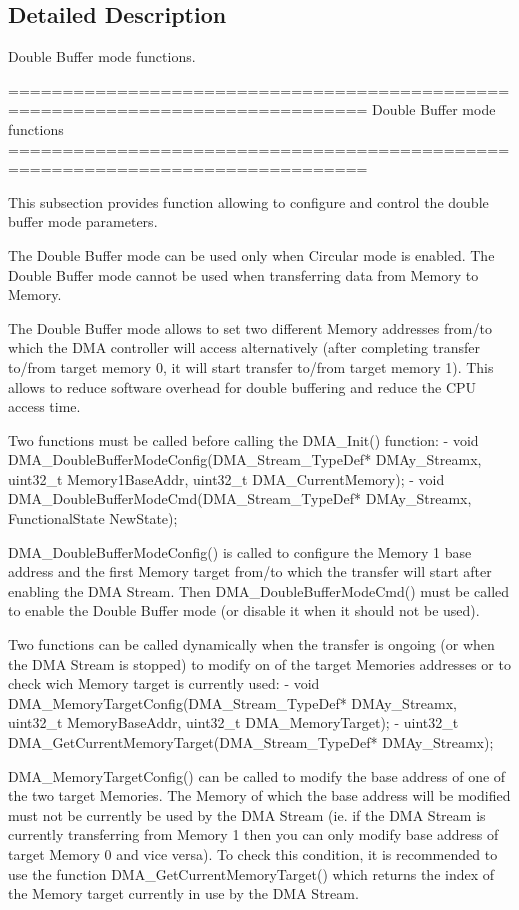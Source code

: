\subsection{Detailed Description}
Double Buffer mode functions. \begin{DoxyVerb} ===============================================================================
                         Double Buffer mode functions
 ===============================================================================  

  This subsection provides function allowing to configure and control the double 
  buffer mode parameters.
  
  The Double Buffer mode can be used only when Circular mode is enabled.
  The Double Buffer mode cannot be used when transferring data from Memory to Memory.
  
  The Double Buffer mode allows to set two different Memory addresses from/to which
  the DMA controller will access alternatively (after completing transfer to/from target
  memory 0, it will start transfer to/from target memory 1).
  This allows to reduce software overhead for double buffering and reduce the CPU
  access time.

  Two functions must be called before calling the DMA_Init() function:
   - void DMA_DoubleBufferModeConfig(DMA_Stream_TypeDef* DMAy_Streamx, uint32_t Memory1BaseAddr,
                                uint32_t DMA_CurrentMemory);
   - void DMA_DoubleBufferModeCmd(DMA_Stream_TypeDef* DMAy_Streamx, FunctionalState NewState);
   
  DMA_DoubleBufferModeConfig() is called to configure the Memory 1 base address and the first
  Memory target from/to which the transfer will start after enabling the DMA Stream.
  Then DMA_DoubleBufferModeCmd() must be called to enable the Double Buffer mode (or disable 
  it when it should not be used).
  
   
  Two functions can be called dynamically when the transfer is ongoing (or when the DMA Stream is 
  stopped) to modify on of the target Memories addresses or to check wich Memory target is currently
   used:
    - void DMA_MemoryTargetConfig(DMA_Stream_TypeDef* DMAy_Streamx, uint32_t MemoryBaseAddr,
                            uint32_t DMA_MemoryTarget);
    - uint32_t DMA_GetCurrentMemoryTarget(DMA_Stream_TypeDef* DMAy_Streamx);

  DMA_MemoryTargetConfig() can be called to modify the base address of one of the two target Memories.
  The Memory of which the base address will be modified must not be currently be used by the DMA Stream
  (ie. if the DMA Stream is currently transferring from Memory 1 then you can only modify base address
  of target Memory 0 and vice versa).
  To check this condition, it is recommended to use the function DMA_GetCurrentMemoryTarget() which
  returns the index of the Memory target currently in use by the DMA Stream.\end{DoxyVerb}
 

